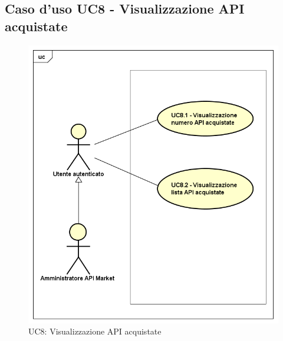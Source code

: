 \newpage
\subsection{Caso d'uso UC8 - Visualizzazione API acquistate}
\label{UC8}
\begin{figure}[ht]
	\centering
	\includegraphics[scale=0.45]{UML/UC8.png}
	\caption{UC8: Visualizzazione API acquistate}
\end{figure}

